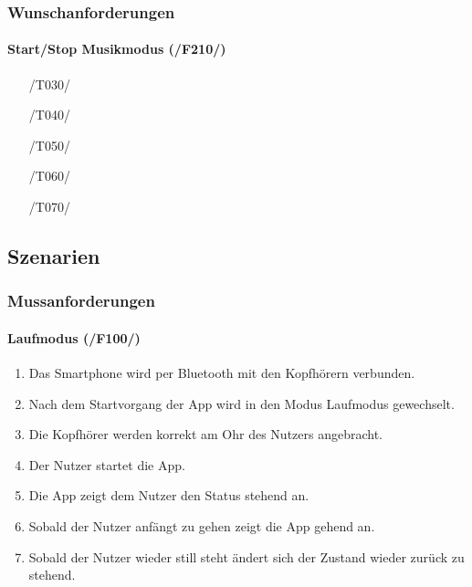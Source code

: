 \documentclass[a4paper,12pt]{article}
\begin{document}
    \subsubsection{Wunschanforderungen}
      \paragraph{Start/Stop Musikmodus (/F210/)}
      \begin{itemize}
        \item[/T030/] 
        \item[/T040/] 
        \item[/T050/] 
        \item[/T060/] 
        \item[/T070/] 
      \end{itemize}
      

  \subsection{Szenarien}
    \subsubsection{Mussanforderungen}
      \paragraph{Laufmodus (/F100/)}
      \begin{enumerate}
        \item Das Smartphone wird per Bluetooth mit den Kopfhörern verbunden.
        \item Nach dem Startvorgang der App wird in den Modus \glqq Laufmodus\grqq{} gewechselt. %
        \item Die Kopfhörer werden korrekt am Ohr des Nutzers angebracht. %
        \item Der Nutzer startet die App.
        \item Die App zeigt dem Nutzer den Status \glqq stehend\grqq{} an.
        \item Sobald der Nutzer anfängt zu gehen zeigt die App \glqq gehend\grqq{} an.
        \item Sobald der Nutzer wieder still steht ändert sich der Zustand wieder zurück zu \glqq stehend\grqq. 
      \end{enumerate}
\end{document}
